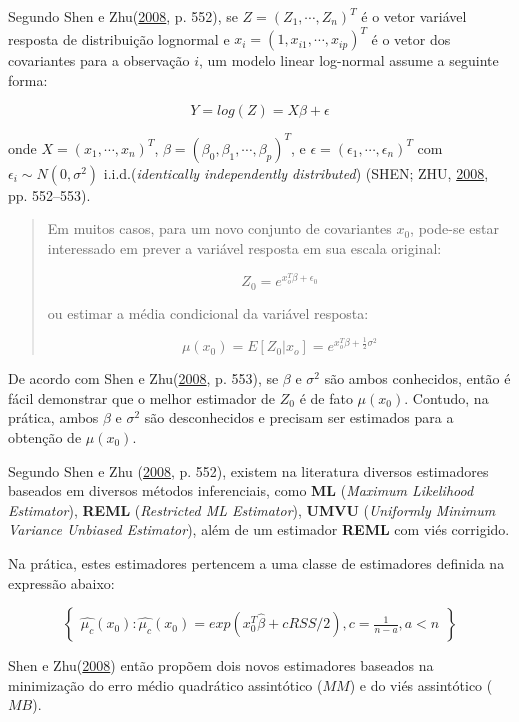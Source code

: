 \documentclass[a4paper]{article}
\begin{document}
Segundo Shen e Zhu(\protect\hyperlink{ref-shen}{2008}, p. 552), se
\(Z = (Z_1,\cdots, Z_n)^T\) é o vetor variável resposta de distribuição
lognormal e \(x_i = (1, x_{i1}, \cdots, x_{ip})^T\) é o vetor dos
covariantes para a observação \(i\), um modelo linear log-normal assume
a seguinte forma:

\[Y = log(Z) = X\beta + \epsilon\]

onde \(X = (x_1, \cdots, x_n)^T\),
\(\beta = (\beta_0, \beta_1, \cdots, \beta_p)^T\), e
\(\epsilon = (\epsilon_1, \cdots, \epsilon_n)^T\) com
\(\epsilon_i \sim N(0, \sigma^2)\) i.i.d.(\emph{identically
independently distributed}) (SHEN; ZHU,
\protect\hyperlink{ref-shen}{2008}, pp. 552--553).

\begin{quote}
Em muitos casos, para um novo conjunto de covariantes \(x_0\), pode-se
estar interessado em prever a variável resposta em sua escala original:

\[Z_0 = e^{x_o^T\beta + \epsilon_0}\]

ou estimar a média condicional da variável resposta:

\[\mu(x_0)=E[Z_0|x_o] = e^{x_o^T\beta + \frac{1}{2}\sigma^2}\]
\end{quote}

De acordo com Shen e Zhu(\protect\hyperlink{ref-shen}{2008}, p. 553), se
\(\beta\) e \(\sigma^2\) são ambos conhecidos, então é fácil demonstrar
que o melhor estimador de \(Z_0\) é de fato \(\mu(x_0)\). Contudo, na
prática, ambos \(\beta\) e \(\sigma^2\) são desconhecidos e precisam ser
estimados para a obtenção de \(\mu(x_0)\).

Segundo Shen e Zhu (\protect\hyperlink{ref-shen}{2008}, p. 552), existem
na literatura diversos estimadores baseados em diversos métodos
inferenciais, como \textbf{ML} (\emph{Maximum Likelihood Estimator}),
\textbf{REML} (\emph{Restricted ML Estimator}), \textbf{UMVU}
(\emph{Uniformly Minimum Variance Unbiased Estimator}), além de um
estimador \textbf{REML} com viés corrigido.

Na prática, estes estimadores pertencem a uma classe de estimadores
definida na expressão abaixo:

\[\begin{Bmatrix}
\hat{\mu_c}(x_0):\hat{\mu_c}(x_0) = exp(x_0^T\hat{\beta} + cRSS/2), c = \frac{1}{n-a}, a<n
\end{Bmatrix}\]

Shen e Zhu(\protect\hyperlink{ref-shen}{2008}) então propõem dois novos
estimadores baseados na minimização do erro médio quadrático assintótico
(\(MM\)) e do viés assintótico (\(MB\)).
\end{document}

